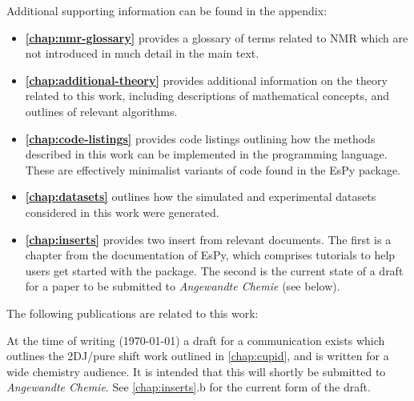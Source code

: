 Additional supporting information can be found in the appendix:
\begin{itemize}
    \item \textbf{\cref{chap:nmr-glossary}} provides a glossary of terms
        related to \ac{NMR} which are not introduced in much detail in the main
        text.
    \item \textbf{\cref{chap:additional-theory}} provides additional
        information on the theory related to this work, including descriptions
        of mathematical concepts, and outlines of relevant algorithms.
    \item \textbf{\cref{chap:code-listings}} provides code listings outlining
        how the methods described in this work can be implemented in the
        \Python programming language.
        These are effectively minimalist variants of code found in the
        \ac{EsPy} package.
    \item \textbf{\cref{chap:datasets}} outlines how the simulated and
        experimental datasets considered in this work were generated.
    \item \textbf{\cref{chap:inserts}} provides two insert from relevant
        documents. The first is a chapter from the documentation of \ac{EsPy},
        which comprises tutorials to help users get started with the package.
        The second is the current state of a draft for a paper to be submitted
        to \textit{Angewandte Chemie} (see below).
\end{itemize}

The following publications are related to this work:


At the time of writing (\today) a draft for a communication exists which
outlines the \ac{2DJ}/pure shift work outlined in \cref{chap:cupid}, and is
written for a wide chemistry audience.  It is intended that this will shortly
be submitted to \textit{Angewandte Chemie}.  See \cref{chap:inserts}.b for
the current form of the draft.

